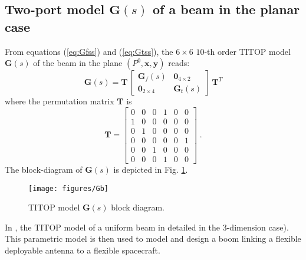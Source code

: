 \subsection{Two-port model $\mathbf{G}(s)$ of a beam in the planar case}
From equations (\ref{eq:Gfss}) and (\ref{eq:Gtss}), the $6\times 6$ $10$-th order TITOP model $\mathbf{G}(s)$ of the beam in the plane $(P^0,\mathbf{x},\mathbf{y})$ reads:
\begin{equation}\label{eq:Gss}
\mathbf{G}(s)=\mathbf{T}\,\left[\begin{array}{cc}\mathbf{G}_f(s) & \mathbf{0}_{4\times 2}\\\mathbf{0}_{2\times 4}& \mathbf{G}_t(s) \end{array}\right]\,\mathbf{T}^T
\end{equation}
where the permutation matrix $\mathbf{T}$ is
\[
\mathbf{T}=\left[\begin{array}{cccccc}
0 & 0 & 0 & 1 & 0 & 0\\ 1 & 0 & 0 & 0 & 0 & 0\\
0 & 1 & 0 & 0 & 0 & 0\\ 0 & 0 & 0 & 0 & 0 & 1\\
0 & 0 & 1 & 0 & 0 & 0\\ 0 & 0 & 0 & 1 & 0 & 0
\end{array}\right]\;.
\]
The block-diagram of $\mathbf{G}(s)$ is depicted in Fig. \ref{fig:G}.
\begin{figure}[htbp!]
  \texttt{[image: figures/Gb]}
\caption{TITOP model $\mathbf{G}(s)$ block diagram.}
\label{fig:G} 
\end{figure}

In \cite{Murali2015}, the TITOP model of a uniform beam in detailed in the $3$-dimension case). This parametric model is then used to model and design a boom linking a flexible deployable antenna to a flexible spacecraft.


